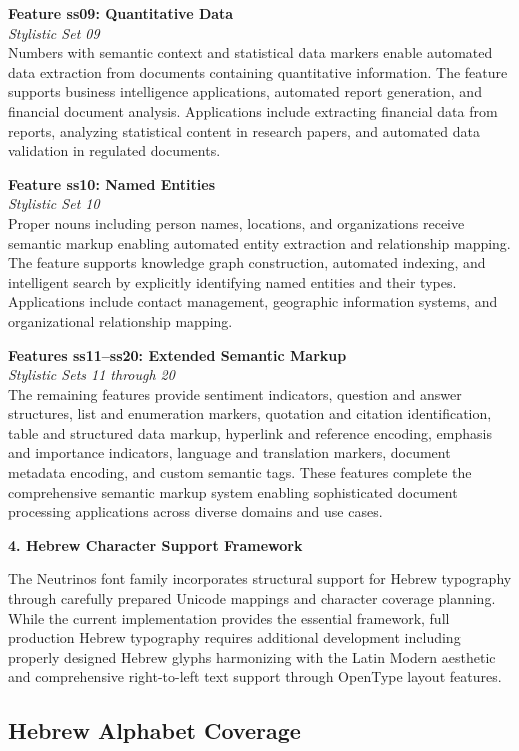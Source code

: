 \documentclass[11pt,letterpaper]{article}
\newcommand{\featurebox}[3]{%
\noindent
\colorbox{sectiongray}{%
\begin{minipage}{\dimexpr\textwidth-2\fboxsep}
\vspace{0.3em}
{\color{neutrinosblue}\large\textbf{#1}}\\[0.3em]
{\small\textit{#2}}\\[0.5em]
#3
\vspace{0.3em}
\end{minipage}}
\vspace{1em}
}
\newcommand{\sectionheader}[1]{%
\vspace{1em}
\noindent
\colorbox{neutrinosblue}{%
\begin{minipage}{\textwidth}
\vspace{0.3em}
{\color{white}\LARGE\textbf{#1}}
\vspace{0.3em}
\end{minipage}}
\vspace{0.5em}
}
\begin{document}
\featurebox{Feature ss09: Quantitative Data}{Stylistic Set 09}{%
Numbers with semantic context and statistical data markers enable automated data extraction from documents containing quantitative information. The feature supports business intelligence applications, automated report generation, and financial document analysis. Applications include extracting financial data from reports, analyzing statistical content in research papers, and automated data validation in regulated documents.
}

\featurebox{Feature ss10: Named Entities}{Stylistic Set 10}{%
Proper nouns including person names, locations, and organizations receive semantic markup enabling automated entity extraction and relationship mapping. The feature supports knowledge graph construction, automated indexing, and intelligent search by explicitly identifying named entities and their types. Applications include contact management, geographic information systems, and organizational relationship mapping.
}

\featurebox{Features ss11--ss20: Extended Semantic Markup}{Stylistic Sets 11 through 20}{%
The remaining features provide sentiment indicators, question and answer structures, list and enumeration markers, quotation and citation identification, table and structured data markup, hyperlink and reference encoding, emphasis and importance indicators, language and translation markers, document metadata encoding, and custom semantic tags. These features complete the comprehensive semantic markup system enabling sophisticated document processing applications across diverse domains and use cases.
}

\newpage

\sectionheader{4. Hebrew Character Support Framework}

The Neutrinos font family incorporates structural support for Hebrew typography through carefully prepared Unicode mappings and character coverage planning. While the current implementation provides the essential framework, full production Hebrew typography requires additional development including properly designed Hebrew glyphs harmonizing with the Latin Modern aesthetic and comprehensive right-to-left text support through OpenType layout features.

\subsection{Hebrew Alphabet Coverage}
\end{document}
